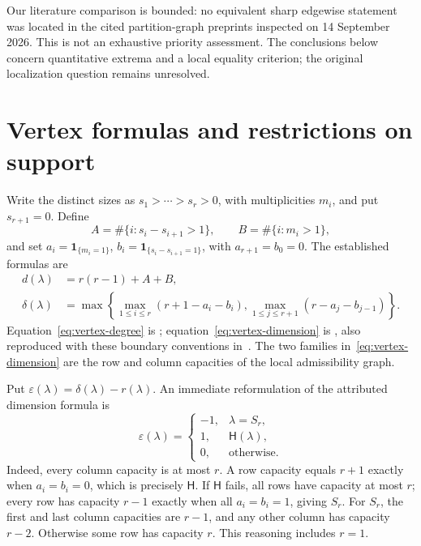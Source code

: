 \documentclass[11pt]{article}
\newcommand{\one}{\mathbf{1}}
\newcommand{\HH}{\mathsf{H}}
\begin{document}
Our literature comparison is bounded: no equivalent sharp edgewise
statement was located in the cited partition-graph preprints inspected on
14 September 2026. This is not an exhaustive priority assessment. The
conclusions below concern quantitative extrema and a local equality
criterion; the original localization question remains unresolved.

\section{Vertex formulas and restrictions on support}

Write the distinct sizes as $s_1>\cdots>s_r>0$, with multiplicities $m_i$,
and put $s_{r+1}=0$. Define
\[
 A=\#\{i:s_i-s_{i+1}>1\},\qquad B=\#\{i:m_i>1\},
\]
and set $a_i=\one_{\{m_i=1\}}$, $b_i=\one_{\{s_i-s_{i+1}=1\}}$,
with $a_{r+1}=b_0=0$. The established formulas are
\begin{align}
 d(\lambda)&=r(r-1)+A+B,\label{eq:vertex-degree}\\
 \delta(\lambda)&=\max\left\{
  \max_{1\leq i\leq r}(r+1-a_i-b_i),
  \max_{1\leq j\leq r+1}(r-a_j-b_{j-1})\right\}.
  \label{eq:vertex-dimension}
\end{align}
Equation~\eqref{eq:vertex-degree} is
\cite[Theorem~2.2]{LyudogovskiyDegree};
equation~\eqref{eq:vertex-dimension} is
\cite[Theorem~7.1]{LyudogovskiyMorphology}, also reproduced with these
boundary conventions in~\cite[Background Proposition~3.1]{LyudogovskiySynthesis}.
The two families in~\eqref{eq:vertex-dimension} are the row and column
capacities of the local admissibility graph.

Put $\varepsilon(\lambda)=\delta(\lambda)-r(\lambda)$. An immediate
reformulation of the attributed dimension formula is
\begin{equation}\label{eq:three-types}
 \varepsilon(\lambda)=
 \begin{cases}
 -1,&\lambda=S_r,\\
 1,&\HH(\lambda),\\
 0,&\text{otherwise}.
 \end{cases}
\end{equation}
Indeed, every column capacity is at most $r$. A row capacity equals $r+1$
exactly when $a_i=b_i=0$, which is precisely $\HH$. If $\HH$ fails,
all rows have capacity at most $r$; every row has capacity $r-1$ exactly
when all $a_i=b_i=1$, giving $S_r$. For $S_r$, the first and last column
capacities are $r-1$, and any other column has capacity $r-2$. Otherwise
some row has capacity $r$. This reasoning includes $r=1$.
\end{document}
